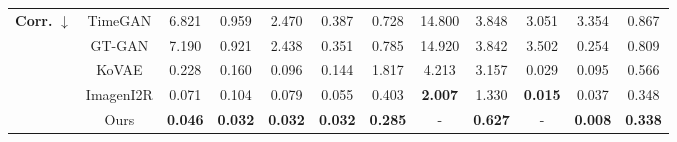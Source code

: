 \documentclass{article}
\theoremstyle{plain}
\theoremstyle{definition}
\theoremstyle{remark}
\begin{document}
\begin{table}[!t]
{\begin{tabular}{cc|cccccccccc}
    \multirow{5}{*}{\textbf{Corr.} $\downarrow$}
      & TimeGAN
         & 6.821
         & 0.959
         & 2.470
         & 0.387
         & 0.728
         & 14.800
         & 3.848
         & 3.051
         & 3.354
         & 0.867 \\
      & GT-GAN
         & 7.190
         & 0.921
         & 2.438
         & 0.351
         & 0.785
         & 14.920
         & 3.842
         & 3.502
         & 0.254
         & 0.809 \\
      & KoVAE
         & 0.228
         & 0.160
         & 0.096
         & 0.144
         & 1.817
         & 4.213
         & 3.157
         & 0.029
         & 0.095
         & 0.566 \\
      & ImagenI2R
         & 0.071
         & 0.104
         & 0.079
         & 0.055
         & 0.403
         & \textbf{2.007}
         & 1.330
         & \textbf{0.015}
         & 0.037
         & 0.348 \\
    & Ours
       & \textbf{0.046} & \textbf{0.032} & \textbf{0.032} & \textbf{0.032} & \textbf{0.285} & - & \textbf{0.627} & - & \textbf{0.008} & \textbf{0.338} \\
    \bottomrule
\end{tabular}
}
\end{table}
\end{document}
